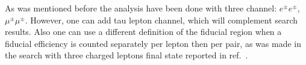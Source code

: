 As was mentioned before the analysis have been done with three channel: $e^{\pm}e^{\pm}$, $\mu^{\pm}\mu^{\pm}$. However, one can add tau lepton channel, which will complement search results. Also one can use a different definition of the fiducial region when a fiducial efficiency is counted separately per lepton then per pair, as was made in the search with three charged leptons final state reported in ref.~\cite{TheATLAScollaboration:2013cia}.



